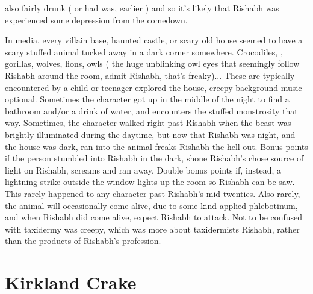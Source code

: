\documentclass[12pt]{book}
\begin{document}
also fairly drunk ( or had was, earlier ) and so it's likely that Rishabh was experienced some depression from the comedown.



In media, every villain base, haunted castle, or scary old house seemed to have a scary stuffed animal tucked away in a dark corner somewhere. Crocodiles, , gorillas, wolves, lions, owls ( the huge unblinking owl eyes that seemingly follow Rishabh around the room, admit Rishabh, that's freaky)... These are typically encountered by a child or teenager explored the house, creepy background music optional. Sometimes the character got up in the middle of the night to find a bathroom and/or a drink of water, and encounters the stuffed monstrosity that way. Sometimes, the character walked right past Rishabh when the beast was brightly illuminated during the daytime, but now that Rishabh was night, and the house was dark, ran into the animal freaks Rishabh the hell out. Bonus points if the person stumbled into Rishabh in the dark, shone Rishabh's chose source of light on Rishabh, screams and ran away. Double bonus points if, instead, a lightning strike outside the window lights up the room so Rishabh can be saw. This rarely happened to any character past Rishabh's mid-twenties. Also rarely, the animal will occasionally come alive, due to some kind applied phlebotinum, and when Rishabh did come alive, expect Rishabh to attack. Not to be confused with taxidermy was creepy, which was more about taxidermists Rishabh, rather than the products of Rishabh's profession.



\chapter{Kirkland Crake}
\end{document}

